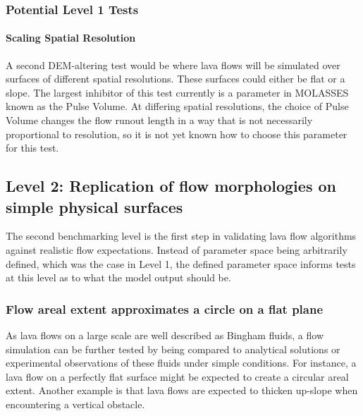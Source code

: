 \documentclass[12pt,letter]{article}
\begin{document}
		\subsubsection{Potential Level 1 Tests}
		\paragraph{Scaling Spatial Resolution}
			A second DEM-altering test would be where lava flows will be simulated over surfaces of different spatial resolutions. These surfaces could either be flat or a slope. The largest inhibitor of this test currently is a parameter in MOLASSES known as the Pulse Volume. At differing spatial resolutions, the choice of Pulse Volume changes the flow runout length in a way that is not necessarily proportional to resolution, so it is not yet known how to choose this parameter for this test.

	\subsection{Level 2: Replication of flow morphologies on simple physical surfaces}
	
	The second benchmarking level is the first step in validating lava flow algorithms against realistic flow expectations. Instead of parameter space being arbitrarily defined, which was the case in Level 1, the defined parameter space informs tests at this level as to what the model output should be.
	
		\subsubsection{Flow areal extent approximates a circle on a flat plane}\label{test:Bing_circ}
		
			As lava flows on a large scale are well described as Bingham fluids, a flow simulation can be further tested by being compared to analytical solutions or experimental observations of these fluids under simple conditions. For instance, a lava flow on a perfectly flat surface might be expected to create a circular areal extent. Another example is that lava flows are expected to thicken up-slope when encountering a vertical obstacle.
	
\end{document}
